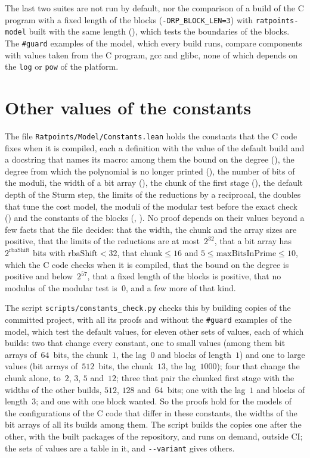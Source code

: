 The last two suites are not run by default, nor the comparison of a build of the C program with a
fixed length of the blocks (\verb|-DRP_BLOCK_LEN=3|) with \verb|ratpoints-model| built with the same
length (), which tests the boundaries of the blocks. The \verb|#guard|
examples of the model, which every build runs, compare components with values taken from the C
program, gcc and glibc, none of which depends on the \verb|log| or \verb|pow| of the platform.

\section{Other values of the constants}\label{sec:ccodeConstants}

The file \verb|Ratpoints/Model/Constants.lean| holds the constants that the C code fixes when it is
compiled, each a definition with the value of the default build and a docstring that names its
macro: among them the bound on the degree (), the degree from which the
polynomial is no longer printed (), the number of bits of the moduli,
the width of a bit array (), the chunk of the first stage
(), the default depth of the Sturm step, the limits of the reductions by a
reciprocal, the doubles that tune the cost model, the moduli of the modular test before the exact
check () and the constants of the blocks (,
). No proof depends on their values beyond a few facts that the file
decides: that the width, the chunk and the array sizes are positive, that the limits of the
reductions are at most~$2^{32}$, that a bit array has $2^{\mathrm{rbaShift}}$ bits with
$\mathrm{rbaShift} < 32$, that $\mathrm{chunk} \le 16$ and $5 \le \mathrm{maxBitsInPrime} \le 10$,
which the C code checks when it is compiled, that the bound on the degree is positive and
below~$2^{57}$, that a fixed length of the blocks is positive, that no modulus of the modular test
is~$0$, and a few more of that kind.

The script \verb|scripts/constants_check.py| checks this by building copies of the committed
project, with all its proofs and without the \verb|#guard| examples of the model, which test the
default values, for eleven other sets of values, each of which builds: two that change every
constant, one to small values (among them bit arrays of~$64$~bits, the chunk~$1$, the lag~$0$ and
blocks of length~$1$) and one to large values (bit arrays of~$512$~bits, the chunk~$13$, the
lag~$1000$); four that change the chunk alone, to~$2$, $3$, $5$ and~$12$; three that pair the
chunked first stage with the widths of the other builds, $512$, $128$ and~$64$~bits; one with the
lag~$1$ and blocks of length~$3$; and one with one block wanted. So the proofs hold for the models
of the configurations of the C code that differ in these constants, the widths of the bit arrays of
all its builds among them. The script builds the copies one after the other, with the built packages
of the repository, and runs on demand, outside CI; the sets of values are a table in it, and
\verb|--variant| gives others.

